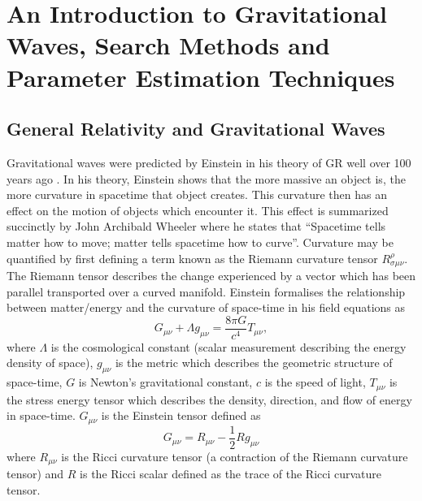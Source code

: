 \chapter[Introduction to Gravitational waves]{An Introduction to Gravitational Waves, Search Methods and Parameter Estimation Techniques}\label{ch:chap_1}


\section{General Relativity and Gravitational Waves}

Gravitational waves were predicted by Einstein in his theory of \ac{GR}
well over 100 years ago \cite{GR_Einstein_paper}. In his theory, Einstein 
shows that the more massive an object is, the more curvature in spacetime that object creates. This curvature then has an effect on the motion of objects which encounter it. This effect is summarized succinctly by John 
Archibald Wheeler where he states that ``Spacetime tells matter how to move; matter tells spacetime how to curve''. Curvature may be quantified by first defining a term known as the Riemann curvature 
tensor $R^{\rho}_{\sigma\mu\nu}$. The Riemann tensor describes the change 
experienced by a vector which has been parallel transported over a curved 
manifold\cite{carroll_2019}. Einstein formalises the relationship between matter/energy and the curvature of space-time in his field equations as
%
\begin{equation}\label{eq:FieldEquations}
    G_{\mu \nu} + \Lambda g_{\mu \nu} = \frac{8 \pi G}{c^{4}} T_{\mu \nu},
\end{equation}{}
%
where $\Lambda$ is the cosmological constant (scalar measurement describing the energy density of space), $g_{\mu \nu}$ is the metric which describes the geometric structure of space-time, $G$ is Newton's gravitational constant, $c$ is the speed of light, $T_{\mu \nu}$ is the stress energy tensor which describes the density, direction, and flow of energy in space-time. $G_{\mu \nu}$ is the Einstein tensor defined as
%
\begin{equation}
    G_{\mu \nu} = R_{\mu \nu} - \frac{1}{2} R g_{\mu \nu}
\end{equation}
%
where $R_{\mu \nu}$ is the Ricci curvature tensor (a contraction of the Riemann 
curvature tensor) and $R$ is the Ricci scalar defined as the trace 
of the Ricci curvature tensor. 

